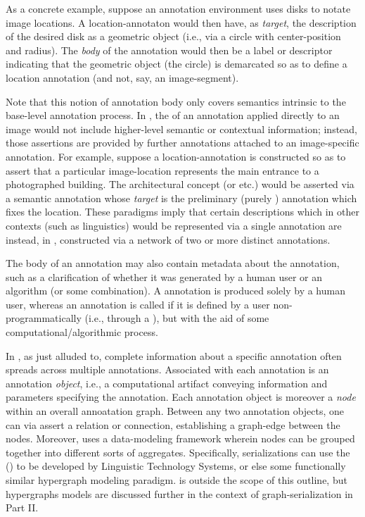 {\begin{description}
As a concrete example, suppose an annotation environment 
uses disks to notate image locations.  A location-annotaton 
would then have, as \textit{target}, the description 
of the desired disk as a geometric object (i.e., 
via a circle with center-position and radius).  
The \textit{body} of the annotation would then 
be a label or descriptor indicating that the 
geometric object (the circle) is demarcated 
so as to define a location annotation (and not, 
say, an image-segment).

Note that this notion of annotation body only 
covers semantics intrinsic to the base-level 
annotation process.  In \AXFI{}, the  
of an annotation applied directly to an 
image would not include higher-level semantic 
or contextual information; instead, those 
assertions are provided by further annotations 
attached to an image-specific annotation.  For 
example, suppose a location-annotation is 
constructed so as to assert that a particular 
image-location represents the main entrance to 
a photographed building.  The architectural 
concept  (or  etc.) 
would be asserted via a semantic annotation 
whose \textit{target} is the preliminary 
(purely ) annotation which fixes 
the location.  These paradigms imply that certain 
descriptions which in other contexts (such 
as linguistics) would be represented via 
a single annotation are instead, in \AXFI{}, 
constructed via a network of two or 
more distinct annotations.

\label{ph:man}The body of an annotation 
may also contain metadata about the annotation, 
such as a clarification of whether it was 
generated by a human user or an algorithm 
(or some combination).  A  annotation 
is produced solely by a human user, whereas 
an annotation is called  
if it is defined by a user non-programmatically 
(i.e., through a \GUI{}), but with the aid of 
some computational/algorithmic process. 

\item[Annotation Graphs]  In \AXFI{}, as 
just alluded to, complete information about 
a specific annotation often spreads 
across multiple annotations.  
Associated with each annotation is an 
annotation \textit{object}, i.e., a 
computational artifact conveying information 
and parameters specifying the annotation.  
Each annotation object is moreover a \textit{node} 
within an overall annoatation graph.  Between 
any two annotation objects, one can via 
\AXFI{} assert a relation or connection, 
establishing a graph-edge between the nodes.  
Moreover, \AXFI{} uses a  
data-modeling framework wherein nodes 
can be grouped together into different sorts 
of aggregates.  Specifically, \AXFI{} 
serializations can use the  (\HGXF{}) to be developed 
by Linguistic Technology Systems, or 
else some functionally similar hypergraph 
modeling paradigm.  
\lHGXF{} is outside the scope of this 
outline, but hypergraphs models are discussed further 
in the context of graph-serialization in 
Part II.  


\end{description}}
